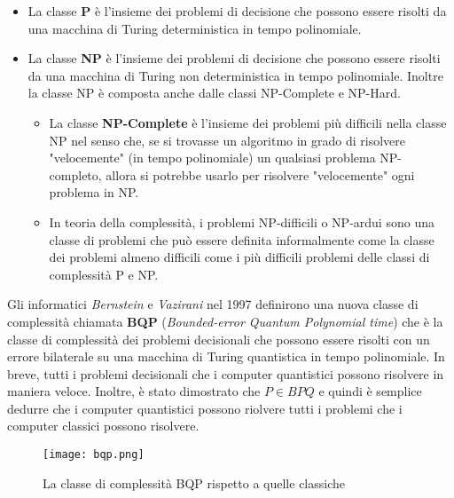 \begin{itemize}
  \item La classe \textbf{P} è l'insieme dei problemi di decisione che possono essere risolti da una macchina di Turing deterministica in tempo polinomiale.
  \item La classe \textbf{NP} è l'insieme dei problemi di decisione che possono essere risolti da una macchina di Turing non deterministica in tempo polinomiale. Inoltre la classe NP è composta anche dalle classi NP-Complete e NP-Hard.
  \begin{itemize}
    \item La classe \textbf{NP-Complete} è l'insieme dei problemi più difficili nella classe NP nel senso che, se si trovasse un algoritmo in grado di risolvere "velocemente" (in tempo polinomiale) un qualsiasi problema NP-completo, allora si potrebbe usarlo per risolvere "velocemente" ogni problema in NP.
    \item In teoria della complessità, i problemi NP-difficili o NP-ardui sono una classe di problemi che può essere definita informalmente come la classe dei problemi almeno difficili come i più difficili problemi delle classi di complessità P e NP.
  \end{itemize}
\end{itemize}

Gli informatici \textit{Bernstein} e \textit{Vazirani} nel 1997 definirono una nuova classe di complessità chiamata \textbf{BQP} \cite{bernstein1997quantum} (\textit{Bounded-error Quantum Polynomial time}) che è la classe di complessità dei problemi decisionali che possono essere risolti con un errore bilaterale su una macchina di Turing quantistica in tempo polinomiale. In breve, tutti i problemi decisionali che i computer quantistici possono risolvere in maniera veloce. Inoltre, è stato dimostrato che \( P \in BPQ \) e quindi è semplice dedurre che i computer quantistici possono riolvere tutti i problemi che i computer classici possono risolvere.

\begin{figure}[htbp]
  \centering
  \texttt{[image: bqp.png]}
  \caption{La classe di complessità BQP rispetto a quelle classiche}
  \label{fig:bqp}
\end{figure}

